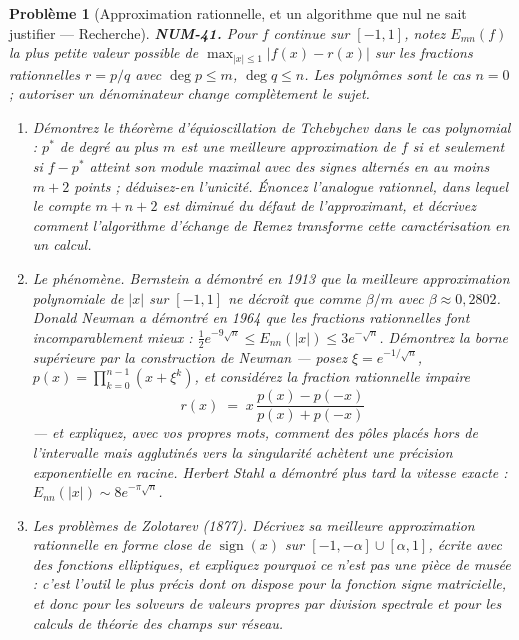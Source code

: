\documentclass[11pt]{article}
\newtheorem{problem}{Problème}
\begin{document}
\begin{problem}[{Approximation rationnelle, et un algorithme que nul ne sait justifier --- Recherche}]
\textbf{NUM-41.} Pour $f$ continue sur $[-1,1]$, notez $E_{mn}(f)$ la plus petite valeur possible de $\max_{|x|\le 1}|f(x) - r(x)|$ sur les fractions rationnelles $r = p/q$ avec $\deg p \le m$, $\deg q \le n$. Les polynômes sont le cas $n = 0$ ; autoriser un dénominateur change complètement le sujet.
\begin{enumerate}
\item[(a)] Démontrez le théorème d'équioscillation de Tchebychev dans le cas polynomial : $p^*$ de degré au plus $m$ est une meilleure approximation de $f$ si et seulement si $f - p^*$ atteint son module maximal avec des signes alternés en au moins $m+2$ points ; déduisez-en l'unicité. Énoncez l'analogue rationnel, dans lequel le compte $m + n + 2$ est diminué du défaut de l'approximant, et décrivez comment l'algorithme d'échange de Remez transforme cette caractérisation en un calcul.
\item[(b)] Le phénomène. Bernstein a démontré en 1913 que la meilleure approximation polynomiale de $|x|$ sur $[-1,1]$ ne décroît que comme $\beta/m$ avec $\beta \approx 0{,}2802$. Donald Newman a démontré en 1964 que les fractions rationnelles font incomparablement mieux : $\tfrac12 e^{-9\sqrt{n}} \le E_{nn}(|x|) \le 3e^{-\sqrt{n}}$. Démontrez la borne supérieure par la construction de Newman --- posez $\xi = e^{-1/\sqrt{n}}$, $p(x) = \prod_{k=0}^{n-1}(x + \xi^k)$, et considérez la fraction rationnelle impaire
\[ r(x) \;=\; x\,\frac{p(x) - p(-x)}{p(x) + p(-x)} \]
--- et expliquez, avec vos propres mots, comment des pôles placés hors de l'intervalle mais agglutinés vers la singularité achètent une précision exponentielle en racine. Herbert Stahl a démontré plus tard la vitesse exacte : $E_{nn}(|x|) \sim 8 e^{-\pi\sqrt{n}}$.
\item[(c)] Les problèmes de Zolotarev (1877). Décrivez sa meilleure approximation rationnelle en forme close de $\operatorname{sign}(x)$ sur $[-1,-\alpha]\cup[\alpha,1]$, écrite avec des fonctions elliptiques, et expliquez pourquoi ce n'est pas une pièce de musée : c'est l'outil le plus précis dont on dispose pour la fonction signe matricielle, et donc pour les solveurs de valeurs propres par division spectrale et pour les calculs de théorie des champs sur réseau.

\end{enumerate}
\end{problem}
\end{document}
